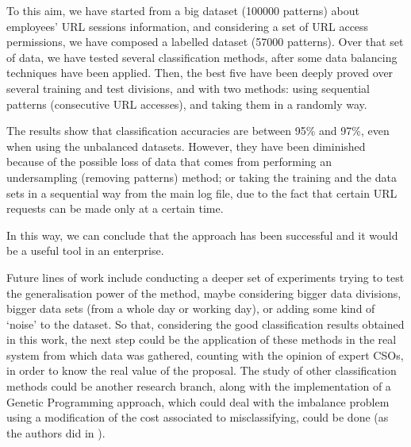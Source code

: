 \documentclass{llncs}
\begin{document}
To this aim, we have started from a big dataset (100000 patterns) about employees' URL sessions information, and considering a set of URL access permissions, we have composed a labelled dataset (57000 patterns). Over that set of data, we have tested several classification methods, after some data balancing techniques have been applied. Then, the best five have been deeply proved over several training and test divisions, and with two methods: using sequential patterns (consecutive URL accesses), and taking them in a randomly way.

The results show that classification accuracies are between 95\% and 97\%, even when using the unbalanced datasets. However, they have been diminished because of the possible loss of data that comes from performing an undersampling (removing patterns) method; or taking the training and the data sets in a sequential way from the main log file, due to the fact that certain URL requests can be made only at a certain time.

In this way, we can conclude that the approach has been successful and it would be a useful tool in an enterprise.

% 
Future lines of work include conducting a deeper set of experiments trying to test the generalisation power of the method, maybe considering bigger data divisions, bigger data sets (from a whole day or working day), or adding some kind of `noise' to the dataset.
So that, considering the good classification results obtained in this work, the next step could be the application of these methods in the real system from which data was gathered, counting with the opinion of expert CSOs, in order to know the real value of the proposal.
The study of other classification methods could be another research branch, along with the implementation of a Genetic Programming approach, which could deal with the imbalance problem using a modification of the cost associated to misclassifying, could be done (as the authors did in \cite{cost_adjustment_07}).
\end{document}
